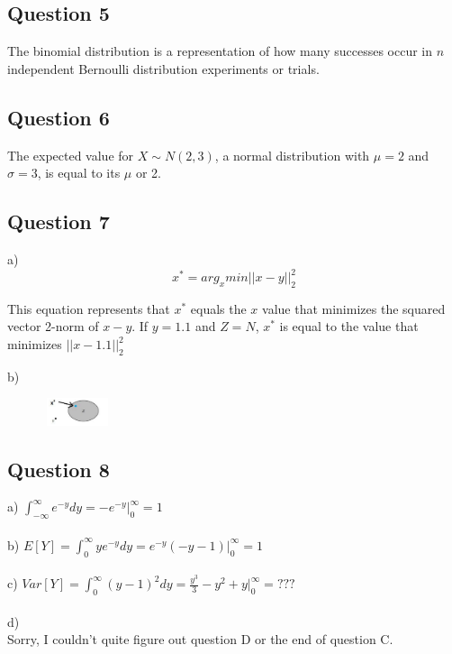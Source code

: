 \documentclass[a4paper]{article}
\begin{document}
\subsection{Question 5}
The binomial distribution is a representation of how many successes occur in $n$ independent Bernoulli distribution experiments or trials.

\subsection{Question 6}
The expected value for $X \mathtt{\sim} N(2,3)$, a normal distribution with $ \mu = 2 $ and $ \sigma = 3$, is equal to its $ \mu $ or 2.

\subsection{Question 7}
a)
\begin{equation}
x^{*}=arg_{x} min||x-y||_{2}^{2}
\end{equation}

This equation represents that $x^{*}$ equals the $x$ value that minimizes the squared vector 2-norm of $x-y$. If $y=1.1$ and $Z=N$, $x^{*}$ is equal to the value that minimizes $||x-1.1||_{2}^{2}$ 

b)
\begin{figure}[h]
  \begin{center}
    \includegraphics[height=8mm, width=20mm]{question7b.pdf}
  \end{center}
\end{figure}

\subsection{Question 8}
a) $\int_{-\infty}^{\infty} e^{-y}dy = -e^{-y}|_{0}^{\infty} = 1$ \\ \\
b) $E[Y] = \int_{0}^{\infty} ye^{-y}dy = e^{-y}(-y-1)|_{0}^{\infty} = 1$ \\ \\
c) $Var[Y] = \int_{0}^{\infty}(y-1)^{2}dy = \frac{y^{3}}{3}-y^{2}+y |_{0}^{\infty} = ???$ \\ \\
d) \\
Sorry, I couldn't quite figure out question D or the end of question C.
\end{document}
